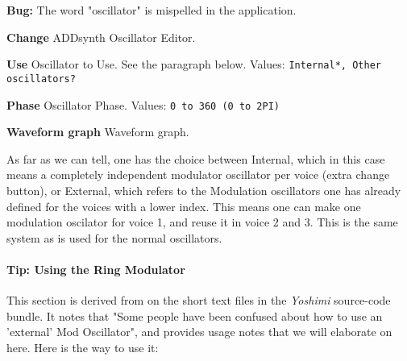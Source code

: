    \textbf{Bug:}
   The word "oscillator" is mispelled in the application.

   \begin{enumber}
      \item \textbf{Change}
         ADDsynth Oscillator Editor.
      \item \textbf{Use}
         Oscillator to Use.
         See the paragraph below.
         Values: \texttt{Internal*, Other oscillators?}
      \item \textbf{Phase}
         Oscillator Phase.
         Values: \texttt{0 to 360 (0 to 2PI)}
      \item \textbf{Waveform graph}
         Waveform graph.
   \end{enumber}

   As far as we can tell, one has the choice between Internal, which in this
   case means a completely independent modulator oscillator per voice (extra
   change button), or External, which refers to the Modulation
   oscillators one has already defined for the voices with a lower index.
   This means one can make one modulation oscilator for voice 1, and reuse it
   in voice 2 and 3.  This is the same system as is used for the normal
   oscillators.

\paragraph{Tip: Using the Ring Modulator}
\label{paragraph:tip_using_the_ring_modulator}

   This section is derived from on the short text files in the
   \textsl{Yoshimi} source-code bundle.  It notes that "Some people have
   been confused about how to use an 'external' Mod Oscillator", and
   provides usage notes that we will elaborate on here.  Here is the way to
   use it:

